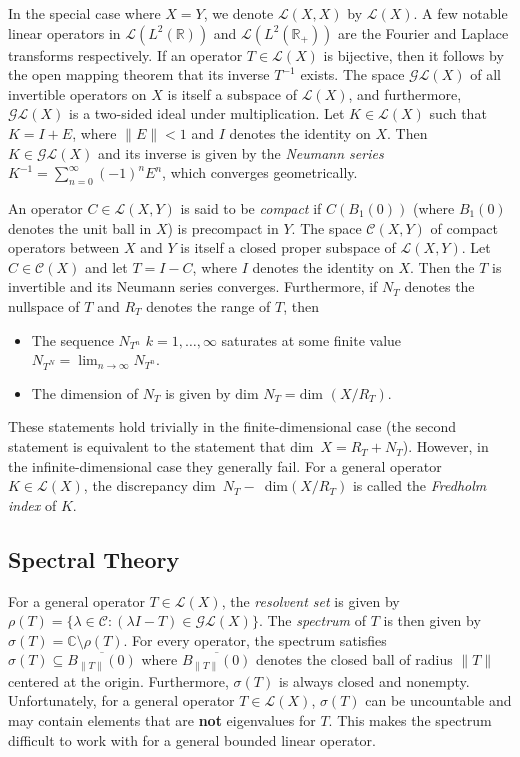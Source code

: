 \documentclass[12pt]{article}
\begin{document}
In the special case where $X = Y$, we denote $\mathcal{L}(X,X)$ by
$\mathcal{L}(X)$. A few notable linear operators in 
$\mathcal{L}(L^2(\mathbb{R}))$ and $\mathcal{L}(L^2(\mathbb{R}_+))$ are
the Fourier and Laplace transforms respectively. If an operator
$T \in \mathcal{L}(X)$ is bijective, then it follows by the open
mapping theorem that its inverse $T^{-1}$ exists. The space
$\mathcal{GL}(X)$ of all invertible operators on $X$ is itself a
subspace of $\mathcal{L}(X)$, and furthermore, $\mathcal{GL}(X)$ is a
two-sided ideal under multiplication. Let $K \in \mathcal{L}(X)$
such that $K = I + E$, where $\|E\| < 1$ and $I$ denotes the identity
on $X$. Then $K \in \mathcal{GL}(X)$ and its inverse is given by the
{\it Neumann series} $K^{-1} = \sum_{n=0}^\infty (-1)^n E^n$, which
converges geometrically.

An operator $C\in\mathcal{L}(X,Y)$ is said to be {\it compact} if $C(B_1(0))$
(where $B_1(0)$ denotes the unit ball in $X$) is precompact in $Y$. The
space $\mathcal{C}(X,Y)$ of compact operators between $X$ and $Y$ is itself
a closed proper subspace of $\mathcal{L}(X,Y)$. Let $C \in \mathcal{C}(X)$
and let $T = I - C$, where $I$ denotes the identity on $X$. Then the $T$
is invertible and its Neumann series converges. Furthermore, if $N_T$
denotes the nullspace of $T$ and $R_T$ denotes the range of $T$, then
\begin{itemize}
	\item The sequence $N_{T^n}$ $k=1,\ldots,\infty$ saturates at
		some finite value
		$N_{T^N} = \lim_{n\rightarrow\infty} N_{T^n}$.
	\item The dimension of $N_T$ is given by 
		$\text{dim }N_T = \text{dim }(X /R_T)$.
\end{itemize}
These statements hold trivially in the finite-dimensional case (the
second statement is equivalent to the statement that dim~$X = R_T + N_T$).
However, in the infinite-dimensional case they generally fail. For a general
operator $K \in \mathcal{L}(X)$, the discrepancy dim~$N_T - $~dim$(X/R_T)$ is
called the {\it Fredholm index} of $K$.

\subsection*{Spectral Theory}

For a general operator $T \in \mathcal{L}(X)$, the {\it resolvent set} is
given by $\rho(T)=\{\lambda\in\mathcal{C}:(\lambda I-T)\in\mathcal{GL}(X)\}$.
The {\it spectrum} of $T$ is then given by 
$\sigma(T) = \mathbb{C}\setminus\rho(T)$. For every
operator, the spectrum satisfies $\sigma(T)\subseteq \overline{B_{\|T\|}(0)}$
where $\overline{B_{\|T\|}(0)}$ denotes the closed ball of radius $\|T\|$
centered at the origin. Furthermore, $\sigma(T)$ is always closed and
nonempty. Unfortunately, for a general operator $T\in\mathcal{L}(X)$,
$\sigma(T)$ can be uncountable and may contain elements that are {\bf not}
eigenvalues for $T$. This makes the spectrum difficult to work with for
a general bounded linear operator.
\end{document}
